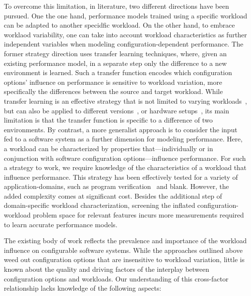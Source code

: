 To overcome this limitation, in literature, two different directions have been pursued. One the one hand, performance models trained using a specific workload can be adapted to another specidfic workload. On the other hand, to embrace worklaod variability, one can take into account workload characteristics as further independent variables when modeling configuration-dependent performance.
The former strategy direction uses transfer learning techniques, where, given an existing performance model, in a separate step only the difference to a new environment is learned. Such a transfer function encodes which configuration options’ influence on performance is sensitive to workload variation, more specifically the differences between the source and target workload. While transfer learning is an effective strategy that is not limited to varying workloads~\cite{jamshidi_learning_2018}, but can also be applied to different versions~\cite{jamishidi_transfer_2017,jamshidi_transfer_gp_2017,martin_transfer_2021}, or hardware setups~\cite{ding_bayesian_2020}, its main limitation is that the transfer function is specific to a difference of two environments.
By contrast, a more generalist approach is to consider the input fed to a software system as a further dimension for modeling performance. Here, a workload can be characterized by properties that---individually or in conjunction with software configuration options---influence performance. For such a strategy to work, we require knowledge of the characteristics of a workload that influence performance. This strategy has been effectively tested for a  variety of application-domains, such as program verification~\cite{koc_satune_2021} and {\color{red}blank}. However, the added complexity comes at significant cost. Besides the additional step of domain-specific workload characterization, screening the inflated configuration-workload problem space for relevant features incurs more measurements required to learn accurate performance models.  

The existing body of work reflects the prevalence and importance of the workload influence on configurable software systems. While the approaches outlined above weed out configuration options that are insensitive to workload variation, little is known about the quality and driving factors of the interplay between configuration options and workloads. Our understanding of this cross-factor relationship lacks knowledge of the following aspects:


